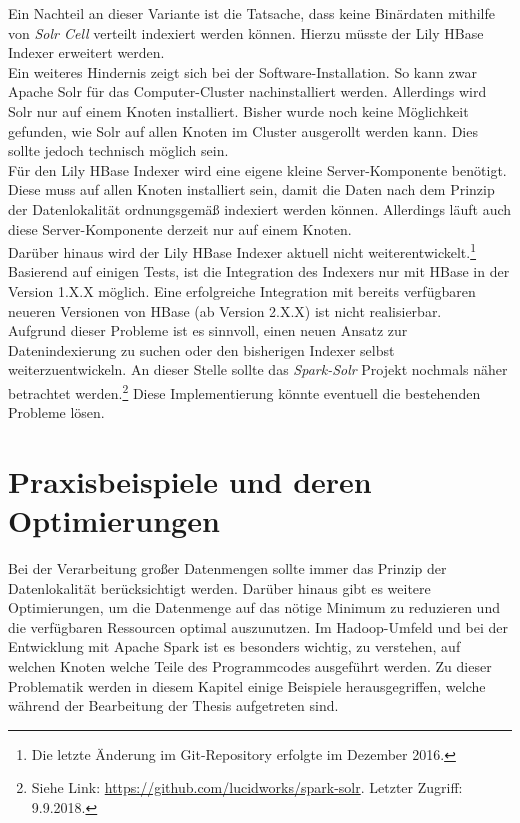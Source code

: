 \noindent
Ein Nachteil an dieser Variante ist die Tatsache, dass keine Binärdaten mithilfe von \textit{Solr Cell} verteilt indexiert werden können. Hierzu müsste der Lily HBase Indexer erweitert werden.\\
Ein weiteres Hindernis zeigt sich bei der Software-Installation. So kann zwar Apache Solr für das Computer-Cluster nachinstalliert werden. Allerdings wird Solr nur auf einem Knoten installiert. Bisher wurde noch keine Möglichkeit gefunden, wie Solr auf allen Knoten im Cluster ausgerollt werden kann. Dies sollte jedoch technisch möglich sein.\\
Für den Lily HBase Indexer wird eine eigene kleine Server-Komponente benötigt. Diese muss auf allen Knoten installiert sein, damit die Daten nach dem Prinzip der Datenlokalität ordnungsgemäß indexiert werden können. Allerdings läuft auch diese Server-Komponente derzeit nur auf einem Knoten.\\
Darüber hinaus wird der Lily HBase Indexer aktuell nicht weiterentwickelt.\footnote{Die letzte Änderung im Git-Repository erfolgte im Dezember 2016.} Basierend auf einigen Tests, ist die Integration des Indexers nur mit HBase in der Version 1.X.X möglich. Eine erfolgreiche Integration mit bereits verfügbaren neueren Versionen von HBase (ab Version 2.X.X) ist nicht realisierbar.\\ 

\noindent
Aufgrund dieser Probleme ist es sinnvoll, einen neuen Ansatz zur Datenindexierung zu suchen oder den bisherigen Indexer selbst weiterzuentwickeln. An dieser Stelle sollte das \textit{Spark-Solr} Projekt nochmals näher betrachtet werden.\footnote{Siehe Link: \url{https://github.com/lucidworks/spark-solr}. Letzter Zugriff: 9.9.2018.} Diese Implementierung könnte eventuell die bestehenden Probleme lösen. 



\section{Praxisbeispiele und deren Optimierungen}
Bei der Verarbeitung großer Datenmengen sollte immer das Prinzip der Datenlokalität berücksichtigt werden. Darüber hinaus gibt es weitere Optimierungen, um die Datenmenge auf das nötige Minimum zu reduzieren und die verfügbaren Ressourcen optimal auszunutzen. Im Hadoop-Umfeld und bei der Entwicklung mit Apache Spark ist es besonders wichtig, zu verstehen, auf welchen Knoten welche Teile des Programmcodes ausgeführt werden. Zu dieser Problematik werden in diesem Kapitel einige Beispiele herausgegriffen, welche während der Bearbeitung der Thesis aufgetreten sind.

